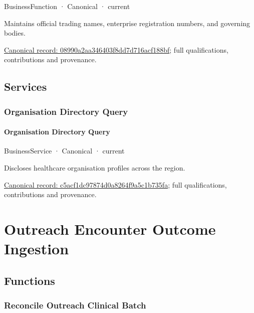 \label{element:08990a2aa346403f8dd7d716acf188bf}
{\small BusinessFunction · Canonical · current}\par

Maintains official trading names, enterprise registration numbers, and governing bodies.


{\footnotesize \href{../../../../continuum/business/business-function/08990a2aa346403f8dd7d716acf188bf.md}{Canonical record: 08990a2aa346403f8dd7d716acf188bf}; full qualifications, contributions and provenance.}\par
\subsection{Services}

\subsubsection{Organisation Directory Query}

\paragraph{Organisation Directory Query}

\label{element:c5acf1dc97874d0a8264f9a5c1b735fa}
{\small BusinessService · Canonical · current}\par

Discloses healthcare organisation profiles across the region.


{\footnotesize \href{../../../../continuum/business/business-service/c5acf1dc97874d0a8264f9a5c1b735fa.md}{Canonical record: c5acf1dc97874d0a8264f9a5c1b735fa}; full qualifications, contributions and provenance.}\par
\section{Outreach Encounter Outcome Ingestion}

\subsection{Functions}

\subsubsection{Reconcile Outreach Clinical Batch}

